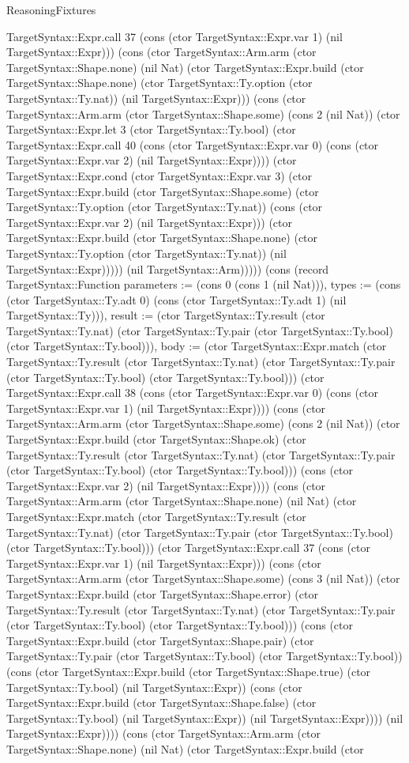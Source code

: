 \begin{lexlean}{ReasoningFixtures}
\begin{semanticmodule}
{TargetSyntax::Expr.call 37 (cons (ctor TargetSyntax::Expr.var 1) (nil TargetSyntax::Expr))) (cons (ctor TargetSyntax::Arm.arm (ctor TargetSyntax::Shape.none) (nil Nat) (ctor TargetSyntax::Expr.build (ctor TargetSyntax::Shape.none) (ctor TargetSyntax::Ty.option (ctor TargetSyntax::Ty.nat)) (nil TargetSyntax::Expr))) (cons (ctor TargetSyntax::Arm.arm (ctor TargetSyntax::Shape.some) (cons 2 (nil Nat)) (ctor TargetSyntax::Expr.let 3 (ctor TargetSyntax::Ty.bool) (ctor TargetSyntax::Expr.call 40 (cons (ctor TargetSyntax::Expr.var 0) (cons (ctor TargetSyntax::Expr.var 2) (nil TargetSyntax::Expr)))) (ctor TargetSyntax::Expr.cond (ctor TargetSyntax::Expr.var 3) (ctor TargetSyntax::Expr.build (ctor TargetSyntax::Shape.some) (ctor TargetSyntax::Ty.option (ctor TargetSyntax::Ty.nat)) (cons (ctor TargetSyntax::Expr.var 2) (nil TargetSyntax::Expr))) (ctor TargetSyntax::Expr.build (ctor TargetSyntax::Shape.none) (ctor TargetSyntax::Ty.option (ctor TargetSyntax::Ty.nat)) (nil TargetSyntax::Expr))))) (nil TargetSyntax::Arm))))}) (cons (record TargetSyntax::Function {parameters := (cons 0 (cons 1 (nil Nat))), types := (cons (ctor TargetSyntax::Ty.adt 0) (cons (ctor TargetSyntax::Ty.adt 1) (nil TargetSyntax::Ty))), result := (ctor TargetSyntax::Ty.result (ctor TargetSyntax::Ty.nat) (ctor TargetSyntax::Ty.pair (ctor TargetSyntax::Ty.bool) (ctor TargetSyntax::Ty.bool))), body := (ctor TargetSyntax::Expr.match (ctor TargetSyntax::Ty.result (ctor TargetSyntax::Ty.nat) (ctor TargetSyntax::Ty.pair (ctor TargetSyntax::Ty.bool) (ctor TargetSyntax::Ty.bool))) (ctor TargetSyntax::Expr.call 38 (cons (ctor TargetSyntax::Expr.var 0) (cons (ctor TargetSyntax::Expr.var 1) (nil TargetSyntax::Expr)))) (cons (ctor TargetSyntax::Arm.arm (ctor TargetSyntax::Shape.some) (cons 2 (nil Nat)) (ctor TargetSyntax::Expr.build (ctor TargetSyntax::Shape.ok) (ctor TargetSyntax::Ty.result (ctor TargetSyntax::Ty.nat) (ctor TargetSyntax::Ty.pair (ctor TargetSyntax::Ty.bool) (ctor TargetSyntax::Ty.bool))) (cons (ctor TargetSyntax::Expr.var 2) (nil TargetSyntax::Expr)))) (cons (ctor TargetSyntax::Arm.arm (ctor TargetSyntax::Shape.none) (nil Nat) (ctor TargetSyntax::Expr.match (ctor TargetSyntax::Ty.result (ctor TargetSyntax::Ty.nat) (ctor TargetSyntax::Ty.pair (ctor TargetSyntax::Ty.bool) (ctor TargetSyntax::Ty.bool))) (ctor TargetSyntax::Expr.call 37 (cons (ctor TargetSyntax::Expr.var 1) (nil TargetSyntax::Expr))) (cons (ctor TargetSyntax::Arm.arm (ctor TargetSyntax::Shape.some) (cons 3 (nil Nat)) (ctor TargetSyntax::Expr.build (ctor TargetSyntax::Shape.error) (ctor TargetSyntax::Ty.result (ctor TargetSyntax::Ty.nat) (ctor TargetSyntax::Ty.pair (ctor TargetSyntax::Ty.bool) (ctor TargetSyntax::Ty.bool))) (cons (ctor TargetSyntax::Expr.build (ctor TargetSyntax::Shape.pair) (ctor TargetSyntax::Ty.pair (ctor TargetSyntax::Ty.bool) (ctor TargetSyntax::Ty.bool)) (cons (ctor TargetSyntax::Expr.build (ctor TargetSyntax::Shape.true) (ctor TargetSyntax::Ty.bool) (nil TargetSyntax::Expr)) (cons (ctor TargetSyntax::Expr.build (ctor TargetSyntax::Shape.false) (ctor TargetSyntax::Ty.bool) (nil TargetSyntax::Expr)) (nil TargetSyntax::Expr)))) (nil TargetSyntax::Expr)))) (cons (ctor TargetSyntax::Arm.arm (ctor TargetSyntax::Shape.none) (nil Nat) (ctor TargetSyntax::Expr.build (ctor }
\end{semanticmodule}
\end{lexlean}
